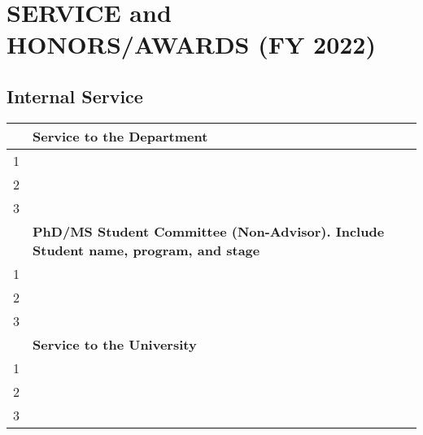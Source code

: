 \documentclass[11pt]{article}
\begin{document}
\newpage
\section{SERVICE and HONORS/AWARDS (FY 2022)}

\subsection{Internal Service}

  \begin{tabular}{ll}
    \toprule
    \textbf{}& \textbf{Service to the Department}\\
      \midrule
    1& \\
    2& \\
    3& \\
    \toprule
    \textbf{}& \textbf{PhD/MS Student Committee (Non-Advisor). Include Student name, program, and stage}\\
      \midrule
    1& \\
    2& \\
    3& \\
    \toprule
    \textbf{}& \textbf{Service to the University}\\
      \midrule
    1& \\
    2& \\
    3& \\
    \bottomrule
  \end{tabular}
\end{document}

